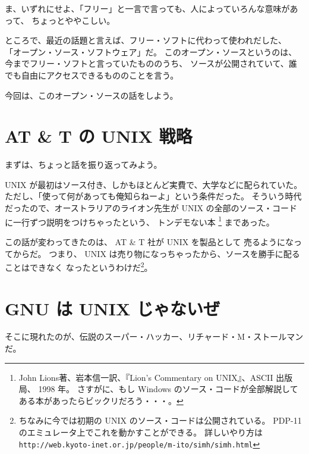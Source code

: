 \documentclass[11pt]{jarticle}
\begin{document}
ま、いずれにせよ、「フリー」と一言で言っても、人によっていろんな意味があって、
ちょっとややこしい。

\bigskip

ところで、最近の話題と言えば、フリー・ソフトに代わって使われだした、
「オープン・ソース・ソフトウェア」だ。
このオープン・ソースというのは、今までフリー・ソフトと言っていたもののうち、
ソースが公開されていて、誰でも自由にアクセスできるもののことを言う。


\bigskip

今回は、このオープン・ソースの話をしよう。

\section{AT \& T の UNIX 戦略}

まずは、ちょっと話を振り返ってみよう。

 UNIX が最初はソース付き、しかもほとんど実費で、大学などに配られていた。
ただし、「使って何があっても俺知らねーよ」という条件だった。
そういう時代だったので、オーストラリアのライオン先生が
 UNIX の全部のソース・コードに一行ずつ説明をつけちゃったという、
トンデモない本
\footnote{John Lions著、岩本信一訳、『Lion's Commentary on UNIX』、ASCII 出版局、 1998 年。
さすがに、もし Windows のソース・コードが全部解説してある本があったらビックリだろう・・・。}
まであった。

この話が変わってきたのは、 AT \& T 社が UNIX を製品として
売るようになってからだ。
つまり、 UNIX は売り物になっちゃったから、ソースを勝手に配ることはできなく
なったというわけだ\footnote{ちなみに今では初期の UNIX のソース・コードは公開されている。
PDP-11 のエミュレータ上でこれを動かすことができる。
詳しいやり方は \texttt{http://web.kyoto-inet.or.jp/people/m-ito/simh/simh.html}}。

\section{GNU は UNIX じゃないぜ}

そこに現れたのが、伝説のスーパー・ハッカー、リチャード・M・ストールマンだ。
\end{document}
